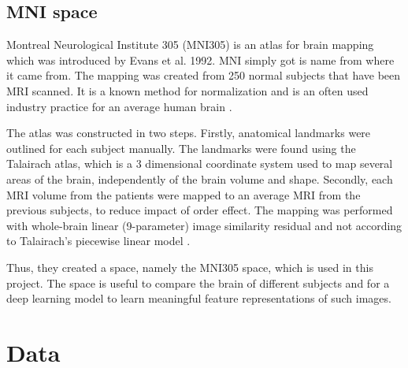 \documentclass[12pt, fleqn, titlepage]{article}
\begin{document}
\subsection{MNI space}
Montreal Neurological Institute 305 (MNI305) is an atlas for brain mapping which was introduced by Evans et al. 1992. MNI simply got is name from where it came from. The mapping was created from 250 normal subjects that have been MRI scanned. It is a known method for normalization and is an often used industry practice for an average human brain  \cite{evans}. 

The atlas was constructed in two steps. Firstly, anatomical landmarks were outlined for each subject manually. The landmarks were found using the Talairach atlas, which is a 3 dimensional coordinate system used to map several areas of the brain, independently of the brain volume and shape. Secondly, each MRI volume from the patients were mapped to an average MRI from the previous subjects, to reduce impact of order effect. %
The mapping was performed with whole-brain linear (9-parameter) image similarity residual and not according to Talairach's piecewise linear model \cite{collins}. 

Thus, they created a space, namely the MNI305 space, which is used in this project. The space is useful to compare the brain of different subjects and for a deep learning model to learn meaningful feature representations of such images. 


\section{Data} 
\end{document}
